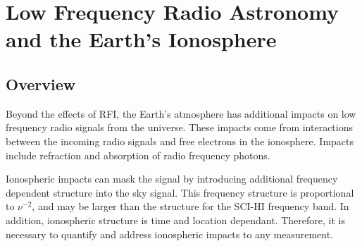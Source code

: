 \chapter{Low Frequency Radio Astronomy and the Earth's Ionosphere}\label{Ch:Iono}


\section{Overview}

Beyond the effects of RFI, the Earth's atmosphere has additional impacts on low frequency radio signals from the universe. These impacts come from interactions between the incoming radio signals and free electrons in the ionosphere. Impacts include refraction and absorption of radio frequency photons. 

Ionospheric impacts can mask the \cm signal by introducing additional frequency dependent structure into the sky signal. This frequency structure is proportional to $\nu^{-2}$, and may be larger than the \cm structure for the SCI-HI frequency band. In addition, ionospheric structure is time and location dependant. Therefore, it is necessary to quantify and address ionospheric impacts to any \cm measurement. 

